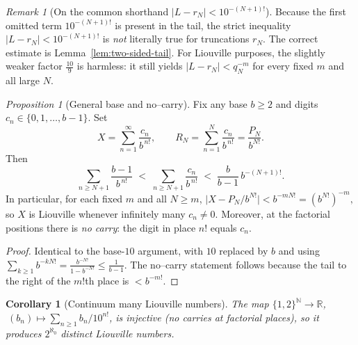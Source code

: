 \documentclass[11pt,a4paper]{article}
\newtheorem{corollary}[theorem]{Corollary}
\theoremstyle{definition}
\theoremstyle{definition}
\theoremstyle{plain}
\theoremstyle{remark}
\newtheorem{remark}[exercise]{Remark}
\newtheorem{proposition}[theorem]{Proposition}
\begin{document}
\begin{remark}[On the common shorthand $|L-r_N|<10^{-(N+1)!}$]
	Because the first omitted term $10^{-(N+1)!}$ is present in the tail, the strict inequality
	$|L-r_N|<10^{-(N+1)!}$ is \emph{not} literally true for truncations $r_N$.
	The correct estimate is Lemma~\ref{lem:two-sided-tail}.
	For Liouville purposes, the slightly weaker factor $\tfrac{10}{9}$ is harmless:
	it still yields $|L-r_N|<q_N^{-m}$ for every fixed $m$ and all large $N$.
\end{remark}


\begin{proposition}[General base and no–carry]\label{prop:base-b}
	Fix any base $b\ge2$ and digits $c_n\in\{0,1,\dots,b-1\}$. Set
	\[
	X=\sum_{n=1}^{\infty} \frac{c_n}{b^{\,n!}},\qquad
	R_N=\sum_{n=1}^{N} \frac{c_n}{b^{\,n!}}=\frac{P_N}{b^{N!}}.
	\]
	Then
	\[
	\sum_{n\ge N+1}\frac{b-1}{b^{\,n!}}
	\;<\;
	\sum_{n\ge N+1}\frac{c_n}{b^{\,n!}}
	\;<\;
	\frac{b}{b-1}\,b^{-(N+1)!}.
	\]
	In particular, for each fixed $m$ and all $N\ge m$,
	\(
	\bigl|X-P_N/b^{N!}\bigr| < b^{-mN!}=(b^{N!})^{-m},
	\)
	so $X$ is Liouville whenever infinitely many $c_n\neq0$.
	Moreover, at the factorial positions there is \emph{no carry}:
	the digit in place $n!$ equals $c_n$.
\end{proposition}

\begin{proof}
	Identical to the base-$10$ argument, with $10$ replaced by $b$ and using
	\(
	\sum_{k\ge1} b^{-kN!} = \frac{b^{-N!}}{1-b^{-N!}} \le \frac{1}{b-1}.
	\)
	The no–carry statement follows because the tail to the right of the $m!$th place is $<b^{-m!}$.
\end{proof}

\begin{corollary}[Continuum many Liouville numbers]
	The map $\{1,2\}^{\mathbb N}\to\mathbb R$, $\ (b_n)\mapsto \sum_{n\ge1} b_n/10^{n!}$,
	is injective (no carries at factorial places), so it produces $2^{\aleph_0}$ distinct Liouville numbers.
\end{corollary}

\end{document}
